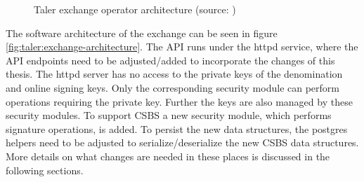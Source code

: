 \begin{figure}[h!]
  \begin{adjustbox}{max totalsize={.9\textwidth}{.7\textheight},center}
  \end{adjustbox}
  \caption{Taler exchange operator architecture (source: \cite{taler-presentation})}
  \label{fig:taler:exchange-operator-architecture}
\end{figure}

The software architecture of the exchange can be seen in figure \ref{fig:taler:exchange-architecture}.
The API runs under the httpd service, where the API endpoints need to be adjusted/added to incorporate the changes of this thesis.
The httpd server has no access to the private keys of the denomination and  online signing keys.
Only the corresponding security module can perform operations requiring the private key.
Further the keys are also managed by these security modules.
To support \gls{CSBS} a new security module, which performs signature operations, is added.
To persist the new data structures, the postgres helpers need to be adjusted to serialize/deserialize the new \gls{CSBS} data structures.
More details on what changes are needed in these places is discussed in the following sections.

